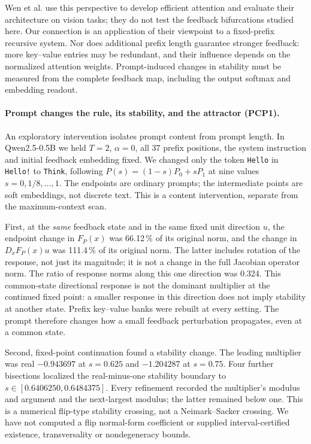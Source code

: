 \documentclass[11pt,letterpaper]{article}
\begin{document}
Wen et al. use this perspective to develop efficient attention and evaluate their
architecture on vision tasks; they do not test the feedback bifurcations studied
here. Our connection is an application of their viewpoint to a fixed-prefix
recursive system. Nor does additional prefix length guarantee stronger feedback:
more key--value entries may be redundant, and their influence depends on the
normalized attention weights. Prompt-induced changes in stability must be measured
from the complete feedback map, including the output softmax and embedding readout.

\paragraph{Prompt changes the rule, its stability, and the attractor (PCP1).}
An exploratory intervention isolates prompt content from prompt length. In
Qwen2.5-0.5B we held $T=2$, $\alpha=0$, all 37 prefix positions, the system
instruction and initial feedback embedding fixed. We changed only the token
\texttt{Hello} in \texttt{Hello!} to \texttt{Think}, following
$P(s)=(1-s)P_0+sP_1$ at nine values $s=0,1/8,\ldots,1$. The endpoints are
ordinary prompts; the intermediate points are soft embeddings, not discrete
text. This is a content intervention, separate from the maximum-context scan.

First, at the \emph{same} feedback state and in the same fixed unit direction
$u$, the endpoint change in $F_P(x)$ was 66.12\,\%
of its original norm, and the change in $D_xF_P(x)u$ was
111.4\,\% of its original norm. The latter
includes rotation of the response, not just its magnitude; it is not a change
in the full Jacobian operator norm. The ratio of response norms along this
one direction was 0.324. This common-state directional response is not the
dominant multiplier at the continued fixed point: a smaller response in this
direction does not imply stability at another state. Prefix key--value
banks were rebuilt at every setting. The prompt therefore changes how a small
feedback perturbation propagates, even at a common state.

Second, fixed-point continuation found a stability change. The leading
multiplier was real $-0.943697$ at $s=0.625$ and $-1.204287$ at $s=0.75$.
Four further bisections localized the real-minus-one stability boundary to
$s\in[0.6406250,0.6484375]$. Every refinement recorded the multiplier's modulus
and argument and the next-largest modulus; the latter remained below one.
This is a numerical flip-type stability crossing, not a Neimark--Sacker
crossing. We have not computed a flip normal-form coefficient or supplied
interval-certified existence, transversality or nondegeneracy bounds.
\end{document}
